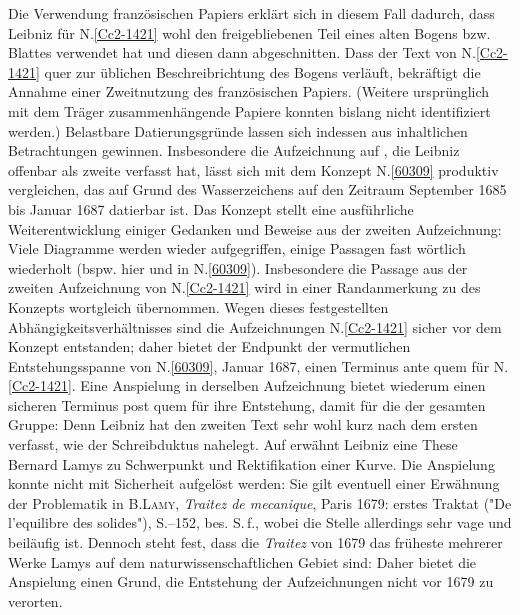 \begin{ledgroup}
Die Verwendung französischen Papiers erklärt sich in diesem Fall dadurch, dass Leibniz für N.\;\ref{Cc2-1421} wohl den freigebliebenen Teil eines alten Bogens bzw. Blattes verwendet hat und diesen dann abgeschnitten. Dass der Text von N.\;\ref{Cc2-1421} quer zur üblichen Beschreibrichtung des Bogens verläuft, bekräftigt die Annahme einer Zweitnutzung des französischen Papiers. (Weitere ursprünglich mit dem Träger zusammenhängende Papiere konnten bislang nicht identifiziert werden.)
\pend
\pstart
Belastbare Datierungsgründe lassen sich indessen aus inhaltlichen Betrachtungen gewinnen. Insbesondere die Aufzeichnung auf , die Leibniz offenbar als zweite verfasst hat, lässt sich mit dem Konzept N.\;\ref{60309} produktiv vergleichen, das auf Grund des Wasserzeichens auf den Zeitraum September 1685 bis Januar 1687 datierbar ist.
Das Konzept stellt eine ausführliche Weiterentwicklung einiger Gedanken und Beweise aus der zweiten Aufzeichnung: Viele Diagramme werden wieder aufgegriffen, einige Passagen fast wörtlich wiederholt (bspw.  hier und  in N.\;\ref{60309}).
Insbesondere die Passage  aus der zweiten Aufzeichnung von N.\;\ref{Cc2-1421} wird in einer Randanmerkung zu  des Konzepts wortgleich übernommen.
Wegen dieses festgestellten Abhängigkeitsverhältnisses sind die Aufzeichnungen N.\;\ref{Cc2-1421} sicher vor dem Konzept entstanden; daher bietet der Endpunkt der vermutlichen Entstehungsspanne von N.\;\ref{60309}, Januar 1687, einen Terminus ante quem für N.\;\ref{Cc2-1421}.
\pend
\pstart
Eine Anspielung in derselben Aufzeichnung bietet wiederum einen sicheren Terminus post quem für ihre Entstehung, damit für die der gesamten Gruppe: Denn Leibniz hat den zweiten Text sehr wohl kurz nach dem ersten verfasst, wie der Schreibduktus nahelegt.
Auf  erwähnt Leibniz eine These
Bernard Lamys zu Schwerpunkt und Rektifikation einer Kurve.
Die Anspielung konnte nicht mit Sicherheit aufgelöst werden: Sie gilt eventuell einer Erwähnung der Problematik in
\textsc{B.\;Lamy}, \cite{01476}\textit{Traitez de mecanique}, Paris 1679: erstes Traktat ("De l'equilibre des solides"), S.--152, bes. S.\,f., wobei die Stelle allerdings sehr vage und beiläufig ist.
Dennoch steht fest, dass die \textit{Traitez} von 1679 das früheste mehrerer Werke Lamys auf dem naturwissenschaftlichen Gebiet sind: Daher bietet die Anspielung einen Grund, die Entstehung der Aufzeichnungen nicht vor 1679 zu verorten.

\end{ledgroup}
